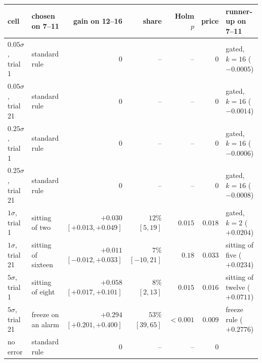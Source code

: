 \begin{tabular}{llrrrrl}
\toprule
cell & chosen on 7--11 & gain on 12--16 & share & Holm $p$ & price & runner-up on 7--11 \\
\midrule
$0.05\sigma$, trial 1 & standard rule & $0$ & -- & -- & $0$ & gated, $k = 16$ ($-0.0005$) \\
$0.05\sigma$, trial 21 & standard rule & $0$ & -- & -- & $0$ & gated, $k = 16$ ($-0.0014$) \\
$0.25\sigma$, trial 1 & standard rule & $0$ & -- & -- & $0$ & gated, $k = 16$ ($-0.0006$) \\
$0.25\sigma$, trial 21 & standard rule & $0$ & -- & -- & $0$ & gated, $k = 16$ ($-0.0008$) \\
$1\sigma$, trial 1 & sitting of two & $+0.030$ $[+0.013, +0.049]$ & $12\%$ $[5, 19]$ & $0.015$ & $0.018$ & gated, $k = 2$ ($+0.0204$) \\
$1\sigma$, trial 21 & sitting of sixteen & $+0.011$ $[-0.012, +0.033]$ & $7\%$ $[-10, 21]$ & $0.18$ & $0.033$ & sitting of five ($+0.0234$) \\
$5\sigma$, trial 1 & sitting of eight & $+0.058$ $[+0.017, +0.101]$ & $8\%$ $[2, 13]$ & $0.015$ & $0.016$ & sitting of twelve ($+0.0711$) \\
$5\sigma$, trial 21 & freeze on an alarm & $+0.294$ $[+0.201, +0.400]$ & $53\%$ $[39, 65]$ & $<0.001$ & $0.009$ & freeze rule ($+0.2776$) \\
no error & standard rule & $0$ & -- & -- & $0$ & \\
\bottomrule
\end{tabular}
